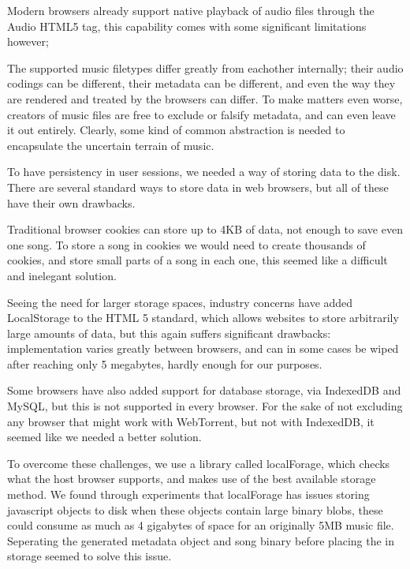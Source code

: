 


Modern browsers already support native playback of audio files through the Audio HTML5 tag, 
this capability comes with some significant limitations however; 
\newline

The supported music filetypes differ greatly from eachother internally; 
their audio codings can be different, their metadata can be different,
and even the way they are rendered and treated by the browsers can differ.
To make matters even worse, 
creators of music files are free to exclude or falsify metadata, and can even leave it out entirely.
Clearly, some kind of common abstraction is needed to encapsulate the uncertain terrain of music.
\newline

To have persistency in user sessions, we needed a way of storing data to the disk. There are several standard ways to store data in web browsers, but all of these have their own drawbacks.

Traditional browser cookies can store up to 4KB of data, 
not enough to save even one song. 
To store a song in cookies we would need to create thousands of cookies, 
and store small parts of a song in each one, 
this seemed like a difficult and inelegant solution.

Seeing the need for larger storage spaces, 
industry concerns have added LocalStorage to the HTML 5 standard,
which allows websites to store arbitrarily large amounts of data,
but this again suffers significant drawbacks: 
implementation varies greatly between browsers, 
and can in some cases be wiped after reaching only 5 megabytes, 
hardly enough for our purposes.

Some browsers have also added support for database storage, via IndexedDB and MySQL, 
but this is not supported in every browser. 
For the sake of not excluding any browser that might work with WebTorrent, but not with IndexedDB,
it seemed like we needed a better solution.
\newline

To overcome these challenges, we use a library called localForage, 
which checks what the host browser supports,
and makes use of the best available storage method.
We found through experiments
that localForage has issues storing javascript objects to disk when these objects contain large binary blobs, 
these could consume as much as 4 gigabytes of space for an originally 5MB music file.
Seperating the generated metadata object and song binary before placing the in storage
seemed to solve this issue.
\newline

